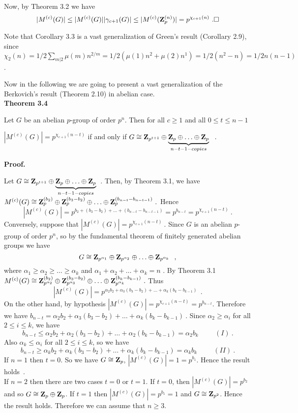  Now, by Theorem 3.2 we have
$$ |M^{(c)}(G)|\leq |M^{(c)}(G)||\gamma_{c+1}(G)|\leq |M^{(c)}({\bf
Z}_p^{(n)})|=p^{\chi_{c+1}(n)}\ .\Box$$

 Note that Corollary 3.3 is a vast generalization of Green's result (Corollary
2.9), since
$\chi_2(n)=1/2\sum_{m|2}^{}\mu(m)n^{2/m}=1/2(\mu(1)n^2+\mu(2)n^1)=1/2(n^2-n)=1/2
n(n-1)$.

 Now in the following we are going to present a vast generalization of the Berkovich's result
(Theorem 2.10) in abelian case.\\
{\bf Theorem 3.4}

Let $G$ be an abelian $p$-group of order $p^n$. Then for all $c\geq 1$ and all $0\leq t\leq n-1$
\begin {center}
$|M^{(c)}(G)|=p^{\chi_{c+1}(n-t)}$ if and only if $G\cong {\bf Z}_{p^{t+1}}\oplus\underbrace{ {\bf Z}_p\oplus \ldots\oplus {\bf Z}_p}_{n-t-1-copies}\ \ .$
\end{center}
{\bf Proof.}

Let $G\cong{\bf Z}_{p^{t+1}}\oplus\underbrace{{\bf
Z}_p\oplus\ldots\oplus{\bf Z}_p}_{n-t-1-copies}$\ . Then, by
Theorem 3.1, we have $M^{(c)}(G)\cong{\bf Z}_p^{(b_2)}\oplus{\bf
Z}_p^{(b_3-b_2)}\oplus\ldots\oplus{\bf
Z}_p^{(b_{n-t}-b_{n-t-1})}\ .$ Hence
$$|M^{(c)}(G)|=p^{b_2+(b_3-b_2)+\ldots+(b_{n-t}-b_{n-t-1})}=p^{b_{n-t}}=p^{\chi_{c+1}(n-t)}\ .$$
 Conversely, suppose that $|M^{(c)}(G)|=p^{\chi_{c+1}(n-t)}\ .$ Since $G$ is an
abelian $p$-group of order $p^n$, so by the fundamental theorem of finitely
generated abelian groups we have
$$G\cong{\bf Z}_{p^{\alpha_1}}\oplus{\bf Z}_{p^{\alpha_2}}\oplus\ldots\oplus{\bf Z}_{p^{\alpha_k}}\ \ ,$$
where $\alpha_1\geq\alpha_2\geq\ldots\geq\alpha_k$ and $\alpha_1+\alpha_2+\ldots+\alpha_k=n$ . By Theorem 3.1 $M^{(c)}(G)\cong{\bf Z}_{p^{\alpha_2}}^{(b_2)}\oplus{\bf Z}_{p^{\alpha_3}}^{(b_3-b_2)}\oplus\ldots\oplus{\bf Z}_{p^{\alpha_k}}^{(b_k-b_{k-1})}\ .$ Thus
$$|M^{(c)}(G)|=p^{\alpha_2b_2+\alpha_3(b_3-b_2)+\ldots+\alpha_k(b_k-b_{k-1})}\ \ .$$
 On the other hand, by hypothesis $|M^{(c)}(G)|=p^{\chi_{c+1}(n-t)}=p^{b_{n-t}}$. Therefore we have $ b_{n-t}=\alpha_2b_2+\alpha_3(b_3-b_2)+\ldots +\alpha_k(b_k-b_{k-1})\ $. Since $\alpha_2\geq\alpha_i$ for all $2\leq i\leq k$, we have
$$b_{n-t}\leq\alpha_2b_2+\alpha_2(b_3-b_2)+\ldots+\alpha_2(b_k-b_{k-1})=\alpha_2b_k\hspace{1cm}(I)\ .$$
Also $\alpha_k\leq\alpha_i$ for all $2\leq i\leq k$, so we have
$$b_{n-t}\geq\alpha_kb_2+\alpha_k(b_3-b_2)+\ldots+\alpha_k(b_k-b_{k-1})=\alpha_kb_k\hspace{1cm}(II)\ .$$
If $n=1$ then $t=0$. So we have $G\cong{\bf Z}_p$, $|M^{(c)}(G)|=1=p^{b_{1}}$. Hence the result holds\ .\\
If $n=2$ then there are two cases $t=0$ or $t=1$. If $t=0$, then $|M^{(c)}(G)|=p^{b_2}$ and so $G\cong{\bf Z}_p\oplus{\bf Z}_p$. If $t=1$ then $|M^{(c)}(G)|=p^{b_1}=1$ and $G\cong{\bf Z}_{p^2}$. Hence the result holds. Therefore we can assume that $n\geq 3$.

